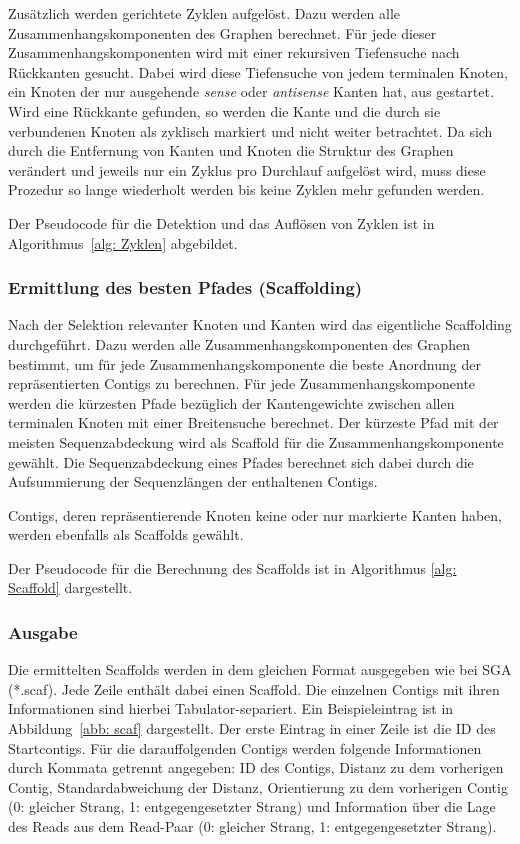 \documentclass[a4paper,11pt,parskip,abstract=on]{scrartcl}
\begin{document}
Zusätzlich werden gerichtete Zyklen aufgelöst. Dazu werden alle
Zusammenhangskomponenten des Graphen berechnet. Für jede dieser
Zusammenhangskomponenten wird mit einer rekursiven Tiefensuche nach
Rückkanten gesucht. Dabei wird diese Tiefensuche von jedem terminalen
Knoten, ein Knoten der nur ausgehende \textit{sense} oder
\textit{antisense} Kanten hat, aus gestartet. Wird eine Rückkante
gefunden, so werden die Kante und die durch sie verbundenen
Knoten als zyklisch markiert und nicht weiter betrachtet. Da sich
durch die Entfernung von Kanten und Knoten die Struktur des Graphen
verändert und jeweils nur ein Zyklus pro Durchlauf
aufgelöst wird, muss diese Prozedur so lange wiederholt werden bis
keine Zyklen mehr gefunden werden.

Der Pseudocode für die Detektion und das Auflösen von Zyklen ist in
Algorithmus~\ref{alg: Zyklen} abgebildet.

\subsubsection{Ermittlung des besten Pfades (Scaffolding)}

Nach der Selektion relevanter Knoten und Kanten wird das eigentliche
Scaffolding durchgeführt. Dazu werden alle Zusammenhangskomponenten
des Graphen bestimmt, um für jede Zusammenhangskomponente die beste
Anordnung der repräsentierten Contigs zu berechnen. Für jede
Zusammenhangskomponente werden die kürzesten Pfade bezüglich der
Kantengewichte zwischen allen terminalen Knoten mit einer Breitensuche
berechnet. Der kürzeste Pfad mit der meisten Sequenzabdeckung wird als
Scaffold für die Zusammenhangskomponente gewählt. Die Sequenzabdeckung
eines Pfades berechnet sich dabei durch die Aufsummierung der
Sequenzlängen der enthaltenen Contigs.

Contigs, deren repräsentierende Knoten keine oder nur markierte Kanten
haben, werden ebenfalls als Scaffolds gewählt.

Der Pseudocode für die Berechnung des Scaffolds ist in Algorithmus
\ref{alg: Scaffold} dargestellt.

\subsubsection{Ausgabe} Die ermittelten Scaffolds werden in dem gleichen
Format ausgegeben wie bei SGA (*.scaf). Jede Zeile enthält dabei einen
Scaffold. Die einzelnen Contigs mit ihren Informationen sind hierbei
Tabulator-separiert. Ein Beispieleintrag ist in Abbildung~\ref{abb: scaf}
dargestellt. Der erste Eintrag in einer Zeile ist die ID des Startcontigs.
Für die darauffolgenden Contigs werden folgende Informationen durch Kommata
getrennt angegeben: ID des Contigs, Distanz zu dem vorherigen Contig,
Standardabweichung der Distanz, Orientierung zu dem vorherigen Contig (0:
gleicher Strang, 1: entgegengesetzter Strang) und Information über die Lage
des Reads aus dem Read-Paar (0: gleicher Strang, 1: entgegengesetzter Strang).
\end{document}
